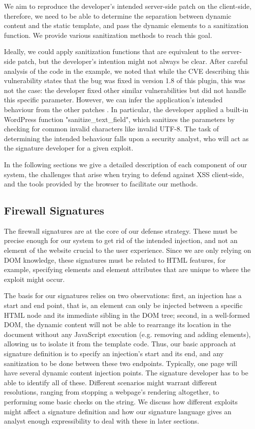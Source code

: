 We aim to reproduce the developer's intended server-side patch on the client-side, therefore, we need to be able to determine the separation between dynamic content and the static template, and pass the dynamic elements to a sanitization function. We provide various sanitization methods to reach this goal.

Ideally, we could apply sanitization functions that are equivalent to the server-side patch, but the developer's intention might not always be clear. After careful analysis of the code in the example, we noted that while the CVE describing this vulnerability states that the bug was fixed in version 1.8 of this plugin, this was not the case: the developer fixed other similar vulnerabilities but did not handle this specific parameter. However, we can infer the application's intended behaviour from the other patches \cite{rccpatch}. In particular, the developer applied a built-in WordPress function "sanitize\_text\_field", which sanitizes the parameters by checking for common invalid characters like invalid UTF-8. The task of determining the intended behaviour falls upon a security analyst, who will act as the signature developer for a given exploit.  

In the following sections we give a detailed description of each component of our system, the challenges that arise when trying to defend against XSS client-side, and the tools provided by the browser to facilitate our methods. 
 
 \subsection{Firewall Signatures}
	 The firewall signatures are at the core of our defense strategy. These must be precise enough for our system to get rid of the intended injection, and not an element of the website crucial to the user experience. Since we are only relying on DOM knowledge, these signatures must be related to HTML features, for example, specifying elements and element attributes that are unique to where the exploit might occur. 
	 
	 The basis for our signatures relies on two observations: first, an injection has a start and end point, that is, an element can only be injected between a specific HTML node and its immediate sibling in the DOM tree; second, in a well-formed DOM, the dynamic content will not be able to rearrange its location in the document without any JavaScript execution (e.g. removing and adding elements), allowing us to isolate it from the template code. Thus, our basic approach at signature definition is to specify an injection's start and its end, and any sanitization to be done between these two endpoints. Typically, one page will have several dynamic content injection points. The signature developer has to be able to identify all of these. Different scenarios might warrant different resolutions, ranging from stopping a webpage's rendering altogether, to performing some basic checks on the string. We discuss how different exploits might affect a signature definition and how our signature language gives an analyst enough expressibility to deal with these in later sections.
	 
